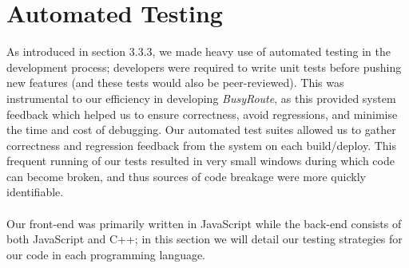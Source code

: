 \documentclass[a4paper, 10pt]{report}
\begin{document}
\section{Automated Testing}
As introduced in section 3.3.3, we made heavy use of automated testing in the development process; developers were required to write unit tests before pushing new features (and these tests would also be peer-reviewed). This was instrumental to our efficiency in developing \textit{BusyRoute}, as this provided system feedback which helped us to ensure correctness, avoid regressions, and minimise the time and cost of debugging. Our automated test suites allowed us to gather correctness and regression feedback from the system on each build/deploy. This frequent running of our tests resulted in very small windows during which code can become broken, and thus sources of code breakage were more quickly identifiable.\\\\
Our front-end was primarily written in JavaScript while the back-end consists of both JavaScript and C++; in this section we will detail our testing strategies for our code in each programming language.
\end{document}
